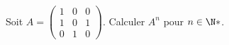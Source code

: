 \begin{enonce}
\begin{exercise}[ID={RMS123 E959, CCP PSI},subtitle={},tags={}]
Soit
\begin{math}
  A=
  \begin{pmatrix}
  1&0&0\\
  1&0&1\\
  0&1&0
  \end{pmatrix}
\end{math}.
Calculer $A^n$ pour $n\in\N*$.
\end{exercise}
\begin{solution}
\end{solution}
\end{enonce}
